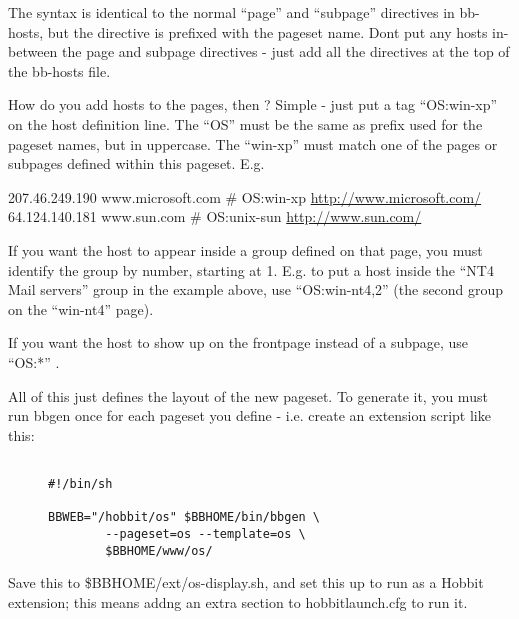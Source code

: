  The syntax is identical to the normal ``page'' and ``subpage''
 directives in bb-hosts, but the directive is prefixed with the
 pageset name. Dont put any hosts in-between the page and subpage
 directives - just add all the directives at the top of the bb-hosts
 file.  

 How do you add hosts to the pages, then ? Simple - just put a tag
 ``OS:win-xp'' on the host definition line. The ``OS'' must be the
 same as prefix used for the pageset names, but in uppercase. The
 ``win-xp'' must match one of the pages or subpages defined within
 this pageset. E.g. 



  207.46.249.190 www.microsoft.com \# OS:win-xp \url{http://www.microsoft.com/} 
 64.124.140.181 www.sun.com \# OS:unix-sun \url{http://www.sun.com/}


  If you want the host to appear inside a group defined on that page,
  you must identify the group by number, starting at 1. E.g. to put a
  host inside the ``NT4 Mail servers'' group in the example above, use
  ``OS:win-nt4,2'' (the second group on the ``win-nt4'' page).  

 If you want the host to show up on the frontpage instead of a subpage, use ``OS:*'' . 


  All of this just defines the layout of the new pageset. To generate
  it, you must run bbgen once for each pageset you define -
  i.e. create an extension script like this: \begin{description}

\item[]\begin{verbatim}

#!/bin/sh

BBWEB="/hobbit/os" $BBHOME/bin/bbgen \
        --pageset=os --template=os \
        $BBHOME/www/os/

\end{verbatim}


\end{description}



  Save this to \$BBHOME/ext/os-display.sh, and set this up to run as a
  Hobbit extension; this means addng an extra section to
  hobbitlaunch.cfg to run it. 



